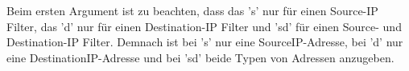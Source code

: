 \documentclass[a4paper,12pt]{scrreprt}
\begin{document}
	Beim ersten Argument ist zu beachten, dass das 's' nur für einen Source-IP Filter, das 'd' nur für einen Destination-IP Filter und 'sd' für einen Source- und Destination-IP Filter. Demnach ist bei 's' nur eine SourceIP-Adresse, bei 'd' nur eine DestinationIP-Adresse und bei 'sd' beide Typen von Adressen anzugeben.
\end{document}

